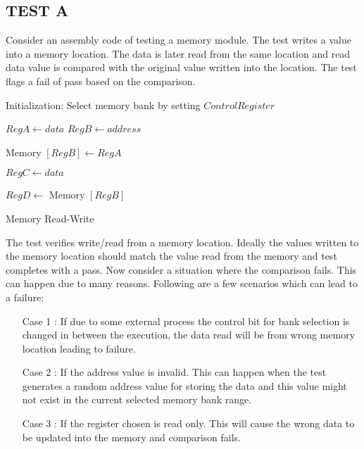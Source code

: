 \subsection {TEST A}
Consider an assembly code of testing a memory module. The test writes a value into a memory location. The data is later read from the same location and read data value is compared with the original value written into the location. The test flags a fail of pass based on the comparison.\\

\IncMargin{1em}
\begin{algorithm}[H]
\DontPrintSemicolon
{}

\BlankLine
Initialization: Select memory bank by setting $Control Register$ \;

	$Reg A \longleftarrow data$\;
	$Reg B \longleftarrow address$\;

	Memory $[Reg B] \longleftarrow Reg A $\;

	$Reg C \longleftarrow data$\;

	$Reg D \longleftarrow$	Memory $[Reg B]$\; 


\caption{Memory Read-Write}
\end{algorithm}\DecMargin{1em}

\vspace{2cm}
The test verifies write/read from a memory location. Ideally the values written to the memory location should match the value read from the memory and test completes with a pass. Now consider a situation where the comparison fails. This can happen due to many reasons. Following are a few scenarios which can lead to a failure:
\begin{itemize}
\item [Case 1]: If due to some external process the control bit for bank selection is changed in between the execution, the data read will be from wrong memory location leading to failure.

\item [Case 2]: If the address value is invalid. This can happen when the test generates a random address value for storing the data and this value might not exist in the current selected memory bank range.

\item [Case 3]:  If the register chosen is read only. This will cause the wrong data to be updated into the memory and comparison fails.
\end{itemize}

